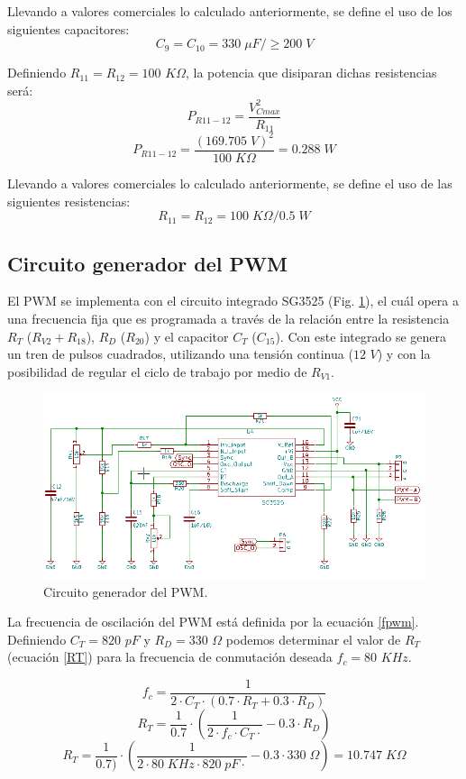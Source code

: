 \documentclass[11pt, a4paper]{article}
\begin{document}
Llevando a valores comerciales lo calculado anteriormente, se define el uso de los siguientes capacitores:
\[ C_9 = C_{10} = 330 \; \mu F / \geq 200 \;V \]

Definiendo $R_{11} = R_{12} = 100$ $K\Omega$, la potencia que disiparan dichas resistencias será:
\begin{equation}
P_{R11-12} = \frac{V_{Cmax}^2}{R_{11}}
\label{PR1112}
\end{equation}
\[ P_{R11-12} = \frac{(169.705 \; V)^2}{100 \; K\Omega } = 0.288 \; W \]

Llevando a valores comerciales lo calculado anteriormente, se define el uso de las siguientes resistencias:
\[ R_{11} = R_{12} = 100 \; K\Omega / 0.5 \;W \]

\subsection{Circuito generador del PWM}
El PWM se implementa con el circuito integrado SG3525 (Fig. \ref{pwm}), el cuál opera a una frecuencia fija que es programada a través de la relación entre la resistencia $R_T$ ($R_{V2} + R_{18}$), $R_D$ ($R_{20}$) y el capacitor $C_T$ ($C_{15}$). Con este integrado se genera un tren de pulsos cuadrados, utilizando una tensión continua ($12$ $V$) y con la posibilidad de regular el ciclo de trabajo por medio de $R_{V1}$.

\begin{figure}[h]
	\centering
	\includegraphics[width = 12 cm]{Imagenes/PWM}
	\caption{Circuito generador del PWM.}
	\label{pwm}
\end{figure}

La frecuencia de oscilación del PWM está definida por la ecuación \ref{fpwm}. Definiendo $C_T = 820$ $pF$ y $R_D = 330$ $\Omega$ podemos determinar el valor de $R_T$ (ecuación \ref{RT}) para la frecuencia de conmutación deseada $f_c = 80$ $KHz$.

\begin{equation}
f_c = \frac{1}{2 \cdot C_T \cdot (0.7 \cdot R_T + 0.3 \cdot R_D)}
\label{fpwm}
\end{equation}
\begin{equation}
R_T = \frac{1}{0.7} \cdot (\frac{1}{2 \cdot f_c \cdot C_T \cdot} - 0.3 \cdot R_D)
\label{RT}
\end{equation}
\[ R_T = \frac{1}{0.7)} \cdot (\frac{1}{2 \cdot 80 \; KHz \cdot 820 \; pF \cdot} - 0.3 \cdot 330 \; \Omega) = 10.747 \; K\Omega \]
\end{document}
